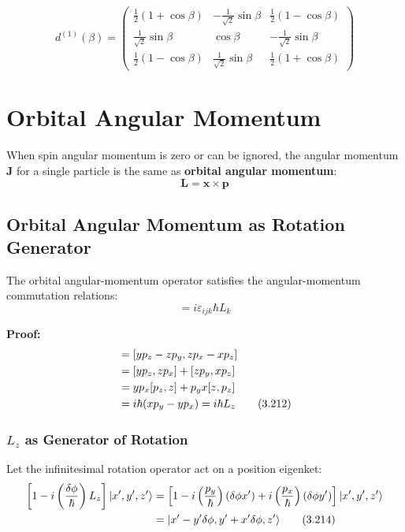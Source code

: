 \documentclass[11pt,a4paper]{article}
\begin{document}
\begin{equation}
\boxed{d^{(1)}(\beta) = \begin{pmatrix} \frac{1}{2}(1+\cos\beta) & -\frac{1}{\sqrt{2}}\sin\beta & \frac{1}{2}(1-\cos\beta) \\ \frac{1}{\sqrt{2}}\sin\beta & \cos\beta & -\frac{1}{\sqrt{2}}\sin\beta \\ \frac{1}{2}(1-\cos\beta) & \frac{1}{\sqrt{2}}\sin\beta & \frac{1}{2}(1+\cos\beta) \end{pmatrix}}
\tag{3.209}
\end{equation}

\section{Orbital Angular Momentum}

When spin angular momentum is zero or can be ignored, the angular momentum $\mathbf{J}$ for a single particle is the same as \textbf{orbital angular momentum}:
\begin{equation}
\mathbf{L} = \mathbf{x} \times \mathbf{p}
\tag{3.210}
\end{equation}

\subsection{Orbital Angular Momentum as Rotation Generator}

The orbital angular-momentum operator satisfies the angular-momentum commutation relations:
\begin{equation}
[L_i, L_j] = i\varepsilon_{ijk}\hbar L_k
\tag{3.211}
\end{equation}

\textbf{Proof:}
\begin{align}
[L_x, L_y] &= [yp_z - zp_y, zp_x - xp_z] \notag \\
&= [yp_z, zp_x] + [zp_y, xp_z] \notag \\
&= yp_x[p_z, z] + p_y x[z, p_z] \notag \\
&= i\hbar(xp_y - yp_x) = i\hbar L_z
\tag{3.212}
\end{align}

\subsubsection{$L_z$ as Generator of Rotation}

Let the infinitesimal rotation operator act on a position eigenket:
\begin{align}
\left[1 - i\left(\frac{\delta\phi}{\hbar}\right)L_z\right]|x', y', z'\rangle &= \left[1 - i\left(\frac{p_y}{\hbar}\right)(\delta\phi x') + i\left(\frac{p_x}{\hbar}\right)(\delta\phi y')\right]|x', y', z'\rangle \notag \\
&= |x' - y'\delta\phi, y' + x'\delta\phi, z'\rangle
\tag{3.214}
\end{align}
\end{document}
